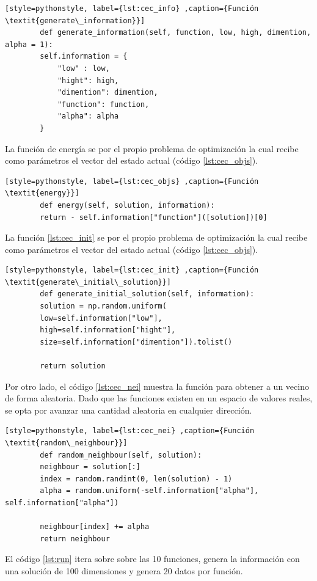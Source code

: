\documentclass[12pt,twoside]{article}
\begin{document}
	\begin{lstlisting}[style=pythonstyle, label={lst:cec_info} ,caption={Función \textit{generate\_information}}]
		def generate_information(self, function, low, high, dimention, alpha = 1):
		self.information = {
			"low" : low,
			"hight": high,
			"dimention": dimention,
			"function": function,
			"alpha": alpha
		}
	\end{lstlisting}
	
	La función de energía se  por el propio problema de optimización la cual recibe como parámetros el vector del estado actual (código \ref{lst:cec_objs}).
	
	\begin{lstlisting}[style=pythonstyle, label={lst:cec_objs} ,caption={Función \textit{energy}}]
		def energy(self, solution, information):
		return - self.information["function"]([solution])[0]
	\end{lstlisting}
	
	La función \ref{lst:cec_init} se  por el propio problema de optimización la cual recibe como parámetros el vector del estado actual (código \ref{lst:cec_objs}).
	
	\begin{lstlisting}[style=pythonstyle, label={lst:cec_init} ,caption={Función \textit{generate\_initial\_solution}}]
		def generate_initial_solution(self, information):
		solution = np.random.uniform(
		low=self.information["low"],
		high=self.information["hight"],
		size=self.information["dimention"]).tolist()
		
		return solution
	\end{lstlisting}
	
	Por otro lado, el código \ref{lst:cec_nei} muestra la función para obtener a un vecino de forma aleatoria. Dado que las funciones existen en un espacio de valores reales, se opta por avanzar una cantidad aleatoria en cualquier dirección.
	
	\begin{lstlisting}[style=pythonstyle, label={lst:cec_nei} ,caption={Función \textit{random\_neighbour}}]
		def random_neighbour(self, solution):
		neighbour = solution[:]
		index = random.randint(0, len(solution) - 1)
		alpha = random.uniform(-self.information["alpha"], self.information["alpha"])
		
		neighbour[index] += alpha
		return neighbour
	\end{lstlisting}
	
	El código \ref{lst:run} itera sobre sobre las 10 funciones, genera la información con una solución de 100 dimensiones y genera 20 datos por función.
	
\end{document}
